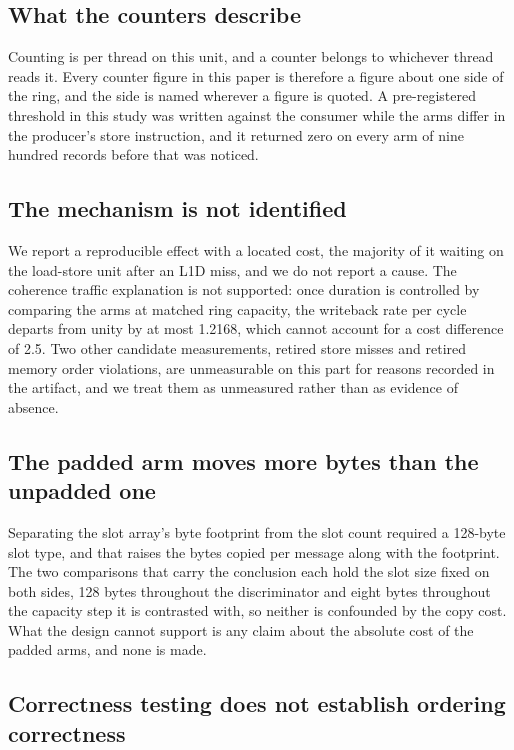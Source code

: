 \documentclass[conference]{IEEEtran}
\begin{document}
\subsection{What the counters describe}

Counting is per thread on this unit, and a counter belongs to whichever thread
reads it. Every counter figure in this paper is therefore a figure about one
side of the ring, and the side is named wherever a figure is quoted. A
pre-registered threshold in this study was written against the consumer while
the arms differ in the producer's store instruction, and it returned zero on
every arm of nine hundred records before that was noticed.

\subsection{The mechanism is not identified}

We report a reproducible effect with a located cost, the majority of it waiting
on the load-store unit after an L1D miss, and we do not report a cause. The
coherence traffic explanation is not supported: once duration is controlled by
comparing the arms at matched ring capacity, the writeback rate per cycle
departs from unity by at most 1.2168, which cannot account for a cost difference
of 2.5. Two other candidate measurements, retired store misses and retired
memory order violations, are unmeasurable on this part for reasons recorded in
the artifact, and we treat them as unmeasured rather than as evidence of
absence.

\subsection{The padded arm moves more bytes than the unpadded one}

Separating the slot array's byte footprint from the slot count required a
128-byte slot type, and that raises the bytes copied per message along with the
footprint. The two comparisons that carry the conclusion each hold the slot size
fixed on both sides, 128 bytes throughout the discriminator and eight bytes
throughout the capacity step it is contrasted with, so neither is confounded by
the copy cost. What the design cannot support is any claim about the absolute
cost of the padded arms, and none is made.

\subsection{Correctness testing does not establish ordering correctness}
\end{document}
